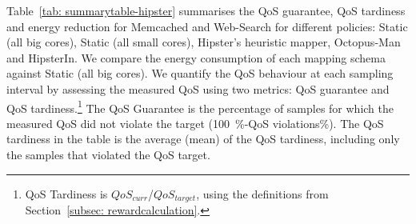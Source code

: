 \begin{table}[t]
\centering
\setlength{\tabcolsep}{2pt}
\caption[Summary of HipsterIn for Memcached, and Web-Search]{ A summary of QoS guarantees, tardiness and energy savings}
\label{tab: summarytable-hipster}
\end{table}


Table~\ref{tab: summarytable-hipster} summarises the QoS guarantee, QoS tardiness and
energy reduction for Memcached and Web-Search for different policies: Static (all big
cores), Static (all small cores), Hipster's heuristic mapper, Octopus-Man and HipsterIn.
We compare the energy consumption of each mapping schema against Static (all big cores).
We quantify the QoS behaviour at each sampling interval by assessing the measured QoS
using two metrics: QoS guarantee and QoS tardiness.\footnote{QoS Tardiness is
$QoS_{\mathit{curr}}$/$QoS_{\mathit{target}}$, using the definitions from
Section~\ref{subsec: rewardcalculation}.} The QoS Guarantee is the percentage of  samples
for which the measured QoS did not violate the target (\SI{100}{\percent}-QoS
violations\%). The QoS tardiness in the table is the average (mean) of the QoS tardiness,
including only the samples that violated the QoS target.

